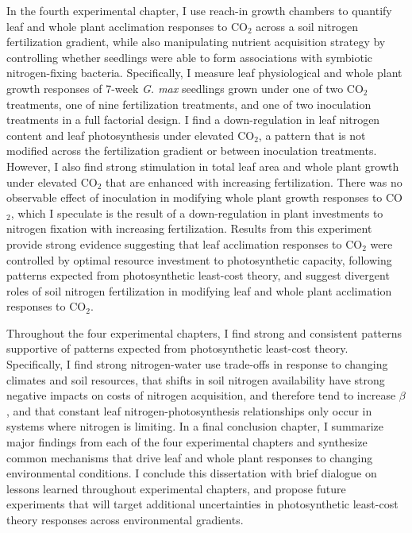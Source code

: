 In the fourth experimental chapter, I use reach-in growth chambers to quantify leaf and whole plant acclimation responses to CO$_2$ across a soil nitrogen fertilization gradient, while also manipulating nutrient acquisition strategy by controlling whether seedlings were able to form associations with symbiotic nitrogen-fixing bacteria. Specifically, I measure leaf physiological and whole plant growth responses of 7-week \textit{G. max} seedlings grown under one of two CO$_2$ treatments, one of nine fertilization treatments, and one of two inoculation treatments in a full factorial design. I find a down-regulation in leaf nitrogen content and leaf photosynthesis under elevated CO$_2$, a pattern that is not modified across the fertilization gradient or between inoculation treatments. However, I also find strong stimulation in total leaf area and whole plant growth under elevated CO$_2$ that are enhanced with increasing fertilization. There was no observable effect of inoculation in modifying whole plant growth responses to CO$_2$, which I speculate is the result of a down-regulation in plant investments to nitrogen fixation with increasing fertilization. Results from this experiment provide strong evidence suggesting that leaf acclimation responses to CO$_2$ were controlled by optimal resource investment to photosynthetic capacity, following patterns expected from photosynthetic least-cost theory, and suggest divergent roles of soil nitrogen fertilization in modifying leaf and whole plant acclimation responses to CO$_2$.

Throughout the four experimental chapters, I find strong and consistent patterns supportive of patterns expected from photosynthetic least-cost theory. Specifically, I find strong nitrogen-water use trade-offs in response to changing climates and soil resources, that shifts in soil nitrogen availability have strong negative impacts on costs of nitrogen acquisition, and therefore tend to increase $\beta$, and that constant leaf nitrogen-photosynthesis relationships only occur in systems where nitrogen is limiting. In a final conclusion chapter, I summarize major findings from each of the four experimental chapters and synthesize common mechanisms that drive leaf and whole plant responses to changing environmental conditions. I conclude this dissertation with brief dialogue on lessons learned throughout experimental chapters, and propose future experiments that will target additional uncertainties in photosynthetic least-cost theory responses across environmental gradients.